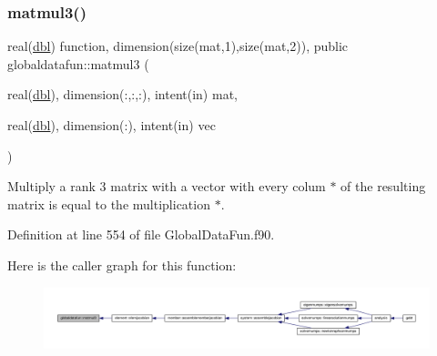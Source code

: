 \subsubsection{\texorpdfstring{matmul3()}{matmul3()}}
{\footnotesize\ttfamily real(\hyperlink{namespaceglobaldatafun_a5008801201dd34f2af8eae07756befb4}{dbl}) function, dimension(size(mat,1),size(mat,2)), public globaldatafun\+::matmul3 (\begin{DoxyParamCaption}\item[{real(\hyperlink{namespaceglobaldatafun_a5008801201dd34f2af8eae07756befb4}{dbl}), dimension(\+:,\+:,\+:), intent(in)}]{mat,  }\item[{real(\hyperlink{namespaceglobaldatafun_a5008801201dd34f2af8eae07756befb4}{dbl}), dimension(\+:), intent(in)}]{vec }\end{DoxyParamCaption})}



Multiply a rank 3 matrix with a vector with every colum $\ast$ of the resulting matrix is equal to the multiplication $\ast$. 



Definition at line 554 of file Global\+Data\+Fun.\+f90.

Here is the caller graph for this function\+:\nopagebreak
\begin{figure}[H]
\begin{center}
\leavevmode
\includegraphics[width=350pt]{namespaceglobaldatafun_a562042b12250dbd7e3ef3a24d9f93a53_icgraph}
\end{center}
\end{figure}
\mbox{\label{namespaceglobaldatafun_a370a248c97771d5e9b8410dedbfb548c}} 

